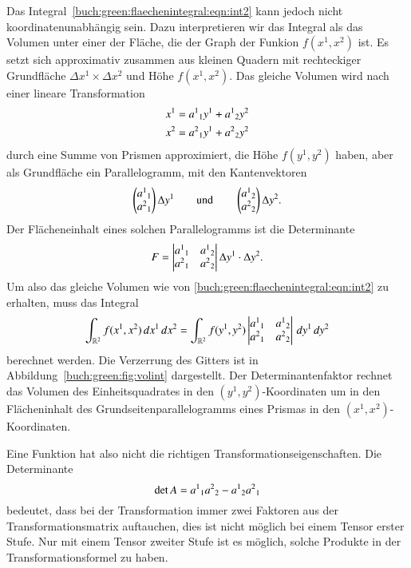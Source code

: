 Das Integral~\eqref{buch:green:flaechenintegral:eqn:int2} kann jedoch
nicht koordinatenunabhängig sein.
%
Dazu interpretieren wir das Integral als das Volumen unter einer der 
Fläche, die der Graph der Funkion $f(x^1,x^2)$ ist.
Es setzt sich approximativ zusammen aus kleinen Quadern mit
rechteckiger Grundfläche $\Delta x^1 \times \Delta x^2$ und Höhe
$f(x^1,x^2)$.
Das gleiche Volumen wird nach einer lineare Transformation 
\[
\begin{aligned}
x^1 &= a^1\mathstrut_1 y^1 + a^1\mathstrut_2 y^2 \\
x^2 &= a^2\mathstrut_1 y^1 + a^2\mathstrut_2 y^2 
\end{aligned}
\]
durch eine Summe von Prismen approximiert, die Höhe $f(y^1,y^2)$ haben,
%
aber als Grundfläche ein Parallelogramm, mit den Kantenvektoren
\[
\begin{pmatrix}
a^1\mathstrut_1\\
a^2\mathstrut_1
\end{pmatrix}
\Delta y^1
\qquad\text{und}\qquad
\begin{pmatrix}
a^1\mathstrut_2\\
a^2\mathstrut_2
\end{pmatrix}
\Delta y^2.
\]
Der Flächeneinhalt eines solchen Parallelogramms ist die Determinante
\[
F
=
\left|
\begin{matrix}
a^1\mathstrut_1 & a^1\mathstrut_2 \\
a^2\mathstrut_1 & a^2\mathstrut_2
\end{matrix}
\right|
\Delta y^1\cdot \Delta y^2.
\]
Um also das gleiche Volumen wie von
\eqref{buch:green:flaechenintegral:eqn:int2}
zu erhalten, muss das Integral
\[
\int_{\mathbb{R}^2}
f(x^1,x^2)
\,dx^1\,dx^2
=
\int_{\mathbb{R}^2}
f(y^1,y^2)
\left|
\begin{matrix}
a^1\mathstrut_1 & a^1\mathstrut_2 \\
a^2\mathstrut_1 & a^2\mathstrut_2
\end{matrix}
\right|
\,dy^1\,dy^2
\]
berechnet werden.
Die Verzerrung des Gitters ist in Abbildung~\ref{buch:green:fig:volint}
dargestellt.
Der Determinantenfaktor rechnet das Volumen des Einheitsquadrates in den
$(y^1,y^2)$-Koordinaten um in den Flächeninhalt des Grundseitenparallelogramms
eines Prismas in den $(x^1,x^2)$-Koordinaten.

Eine Funktion hat also nicht die richtigen Transformationseigenschaften.
Die Determinante
\[
\det A
=
a^1\mathstrut_1
a^2\mathstrut_2
-
a^1\mathstrut_2
a^2\mathstrut_1
\]
bedeutet, dass bei der Transformation immer zwei Faktoren aus der
Transformationsmatrix auftauchen, dies ist nicht möglich bei einem
Tensor erster Stufe.
Nur mit einem Tensor zweiter Stufe ist es möglich, solche Produkte 
in der Transformationsformel zu haben.

